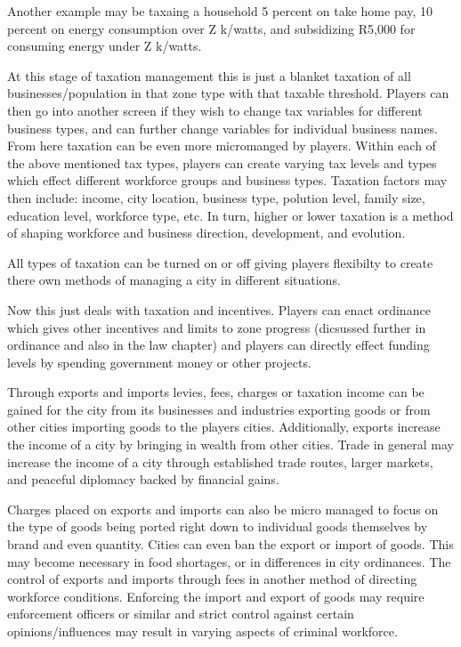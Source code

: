 Another example may be taxaing a household 5 percent on take home pay, 10 percent on energy consumption over Z k/watts, and subsidizing R5,000 for consuming energy under Z k/watts.


At this stage of taxation management this is just a blanket taxation of all businesses/population in that zone type with that taxable threshold. Players can then go into another screen if they wish to change tax variables for different business types, and can further change variables for individual business names. From here taxation can be even more micromanged by players. Within each of the above mentioned tax types, players can create varying tax levels and types which effect different workforce groups and business types. Taxation factors may then include: income, city location, business type, polution level, family size, education level, workforce type, etc. In turn, higher or lower taxation is a method of shaping workforce and business direction, development, and evolution. 

All types of taxation can be turned on or off giving players flexibilty to create there own methods of managing a city in different situations.

Now this just deals with taxation and incentives. Players can enact ordinance which gives other incentives and limits to zone progress (dicsussed further in ordinance and also in the law chapter) and players can directly effect funding levels by spending government money or other projects. 



Through exports and imports levies, fees, charges or taxation income can be gained for the city from its businesses and industries exporting goods or from other cities importing goods to the players cities. Additionally, exports increase the income of a city by bringing in wealth from other cities. Trade in general may increase the income of a city through established trade routes, larger markets, and peaceful diplomacy backed by financial gains. 

Charges placed on exports and imports can also be micro managed to focus on the type of goods being ported right down to individual goods themselves by brand and even quantity. Cities can even ban the export or import of goods. This may become necessary in food shortages, or in differences in city ordinances. The control of exports and imports through fees in another method of directing workforce conditions. Enforcing the import and export of goods may require enforcement officers or similar and strict control against certain opinions/influences may result in varying aspects of criminal workforce.


